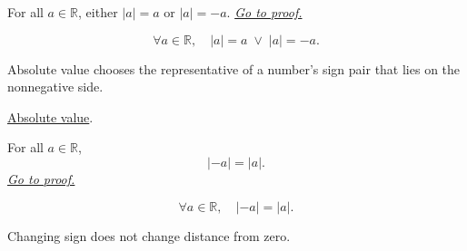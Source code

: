 
\begin{theorem}
\label{thm:absolute-value-self-or-neg}
For all $a \in \mathbb{R}$, either $\lvert a \rvert = a$ or
$\lvert a \rvert = -a$.
\hyperref[prf:absolute-value-self-or-neg]{\textit{Go to proof.}}
\end{theorem}



\begin{remark*}
\[
  \forall a \in \mathbb{R},\quad
  \lvert a \rvert = a \;\lor\; \lvert a \rvert = -a.
\]
\end{remark*}

\begin{remark*}[Interpretation]
Absolute value chooses the representative of a number's sign pair that lies on the nonnegative side.
\end{remark*}

\begin{dependencies}
\hyperref[def:absolute-value]{Absolute value}.
\end{dependencies}


\begin{theorem}
\label{thm:absolute-value-symmetric}
For all $a \in \mathbb{R}$,
\[
  \lvert -a \rvert = \lvert a \rvert.
\]
\hyperref[prf:absolute-value-symmetric]{\textit{Go to proof.}}
\end{theorem}



\begin{remark*}
\[
  \forall a \in \mathbb{R},\quad \lvert -a \rvert = \lvert a \rvert.
\]
\end{remark*}

\begin{remark*}[Interpretation]
Changing sign does not change distance from zero.
\end{remark*}

